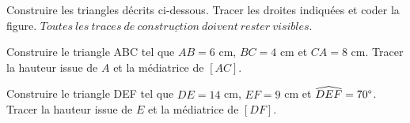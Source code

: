 \documentclass[a4paper,11pt]{exam}
\begin{document}
\vspace*{-0.3cm}

Construire les triangles décrits ci-dessous. Tracer les droites indiquées et coder la figure. $\underline{Toutes\  les\  traces\  de\  construction\  doivent\  rester\  visibles.}$


\begin{questions}
	\question[6] Construire le triangle ABC tel que $AB = 6$ cm, $BC = 4$ cm et $CA = 8$ cm. Tracer la hauteur issue de $A$ et la médiatrice de $[AC]$.
	
	\newpage
	
	\question[6] Construire le triangle DEF tel que $DE = 14$ cm, $EF = 9$ cm et $\widehat{DEF} = 70 \degree$. Tracer la hauteur issue de $E$ et la médiatrice de $[DF]$.
\end{questions}


\label{LastPage}
\end{document}
